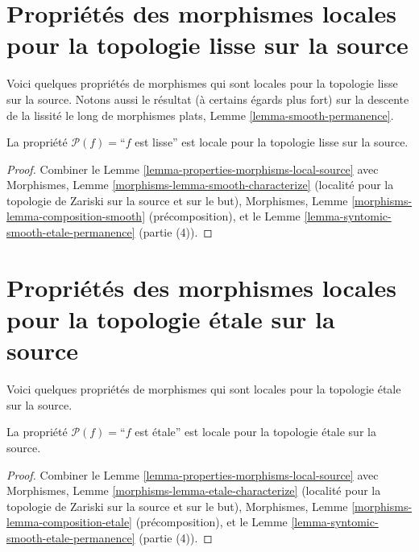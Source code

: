\section{Propriétés des morphismes locales pour la topologie lisse sur la source}
\label{section-smooth-local-source}

\noindent
Voici quelques propriétés de morphismes qui sont locales pour la topologie
lisse sur la source. Notons aussi le résultat (à certains égards plus fort)
sur la descente de la lissité le long de morphismes plats,
Lemme \ref{lemma-smooth-permanence}.

\begin{lemma}
\label{lemma-smooth-smooth-local-source}
La propriété $\mathcal{P}(f)=$``$f$ est lisse''
est locale pour la topologie lisse sur la source.
\end{lemma}

\begin{proof}
Combiner le Lemme \ref{lemma-properties-morphisms-local-source} avec
Morphismes, Lemme \ref{morphisms-lemma-smooth-characterize}
(localité pour la topologie de Zariski sur la source et sur le but),
Morphismes, Lemme \ref{morphisms-lemma-composition-smooth}
(précomposition), et le
Lemme \ref{lemma-syntomic-smooth-etale-permanence} (partie (4)).
\end{proof}



\section{Propriétés des morphismes locales pour la topologie \'etale sur la source}
\label{section-etale-local-source}

\noindent
Voici quelques propriétés de morphismes qui sont locales pour la topologie
\'etale sur la source.

\begin{lemma}
\label{lemma-etale-etale-local-source}
La propriété $\mathcal{P}(f)=$``$f$ est \'etale''
est locale pour la topologie \'etale sur la source.
\end{lemma}

\begin{proof}
Combiner le Lemme \ref{lemma-properties-morphisms-local-source} avec
Morphismes, Lemme \ref{morphisms-lemma-etale-characterize}
(localité pour la topologie de Zariski sur la source et sur le but),
Morphismes, Lemme \ref{morphisms-lemma-composition-etale}
(précomposition), et le
Lemme \ref{lemma-syntomic-smooth-etale-permanence} (partie (4)).
\end{proof}

